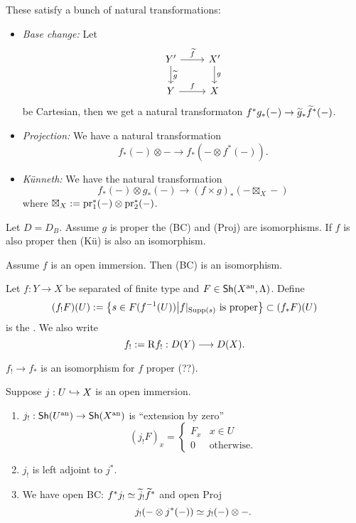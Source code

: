 These satisfy a bunch of natural transformations:
\begin{itemize}
\item \emph{Base change:} Let
\[
\begin{tikzcd}
Y' \ar[r,"\wt{f}"] \ar[d,"\wt{g}"] & X' \ar[d,"g"] \\ Y \ar[r,"f"] & X
\end{tikzcd}
\]
be Cartesian, then we get a natural transformaton $f^{*}g_*(-)\to \wt{g}_*\wt{f}^{*}(-)$.
\item \emph{Projection:} We have a natural transformation
\[
f_*(-)\otimes - \to f_*(-\otimes f^{*}(-)).
\]
\item \emph{K\"unneth:} We have the natural transformation
\[
f_*(-)\otimes g_*(-) \to (f\times g)_*(-\boxtimes_X -)
\]
where $\boxtimes_X:= \operatorname{pr}_1^{*}(-)\otimes \operatorname{pr}_2^{*}(-)$.
\end{itemize}
\begin{theorem}
Let $D=D_B$. Assume $g$ is proper the (BC) and (Proj) are isomorphisms. If $f$ is also
proper then (K\"u) is also an isomorphism.
\end{theorem}
\begin{proposition}
Assume $f$ is an open immersion. Then (BC) is an isomorphism.
\end{proposition}
\begin{definition}
Let $f:Y\to X$ be separated of finite type and $F\in \mathsf{Sh}(X^\text{an},\Lambda)$. Define
\[
(f_!F)(U) := \left\{ s\in F(f^{-1}(U)) \middle| f|_{\operatorname{Supp}(s)}\text{ is proper}
\right\} \subset (f_*F)(U)
\]
is the . We also write
\[
f_! \defeq \RD f_!:D(Y)\to D(X).
\]
\end{definition}
$f_!\to f_*$ is an isomorphism for $f$ proper (??).
\begin{lemma}
Suppose $j:U\hookrightarrow X$ is an open immersion.
\begin{enumerate}[1)]
\item $j_!:\Sh(U\an)\to \Sh(X\an)$ is ``extension by zero''
\[
(j_!F)_x =
\begin{cases}
F_x  & x\in U \\
0 & \text{otherwise}.
\end{cases}
\]
\item $j_!$ is left adjoint to $j^{*}$.
\item We have open BC: $f^{*}j_!\simeq \widetilde{j}_!\widetilde{f}^{*}$ and open Proj
\[
j_!(-\otimes j^{*}(-)) \simeq j_!(-) \otimes -.
\]
\end{enumerate}
\end{lemma}
